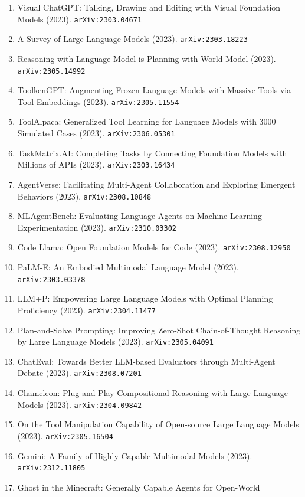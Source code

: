 \documentclass[11pt]{article}
\begin{document}
\begin{enumerate}
  Multi-Agent Debate (2023). \texttt{arXiv:2305.19118}
  \item Visual ChatGPT: Talking, Drawing and Editing with Visual Foundation
  Models (2023). \texttt{arXiv:2303.04671}
  \item A Survey of Large Language Models (2023). \texttt{arXiv:2303.18223}
  \item Reasoning with Language Model is Planning with World Model (2023). \texttt{arXiv:2305.14992}
  \item ToolkenGPT: Augmenting Frozen Language Models with Massive Tools via
  Tool Embeddings (2023). \texttt{arXiv:2305.11554}
  \item ToolAlpaca: Generalized Tool Learning for Language Models with 3000
  Simulated Cases (2023). \texttt{arXiv:2306.05301}
  \item TaskMatrix.AI: Completing Tasks by Connecting Foundation Models with
  Millions of APIs (2023). \texttt{arXiv:2303.16434}
  \item AgentVerse: Facilitating Multi-Agent Collaboration and Exploring
  Emergent Behaviors (2023). \texttt{arXiv:2308.10848}
  \item MLAgentBench: Evaluating Language Agents on Machine Learning
  Experimentation (2023). \texttt{arXiv:2310.03302}
  \item Code Llama: Open Foundation Models for Code (2023). \texttt{arXiv:2308.12950}
  \item PaLM-E: An Embodied Multimodal Language Model (2023). \texttt{arXiv:2303.03378}
  \item LLM+P: Empowering Large Language Models with Optimal Planning
  Proficiency (2023). \texttt{arXiv:2304.11477}
  \item Plan-and-Solve Prompting: Improving Zero-Shot Chain-of-Thought Reasoning
  by Large Language Models (2023). \texttt{arXiv:2305.04091}
  \item ChatEval: Towards Better LLM-based Evaluators through Multi-Agent Debate (2023). \texttt{arXiv:2308.07201}
  \item Chameleon: Plug-and-Play Compositional Reasoning with Large Language
  Models (2023). \texttt{arXiv:2304.09842}
  \item On the Tool Manipulation Capability of Open-source Large Language Models (2023). \texttt{arXiv:2305.16504}
  \item Gemini: A Family of Highly Capable Multimodal Models (2023). \texttt{arXiv:2312.11805}
  \item Ghost in the Minecraft: Generally Capable Agents for Open-World

\end{enumerate}
\end{document}
